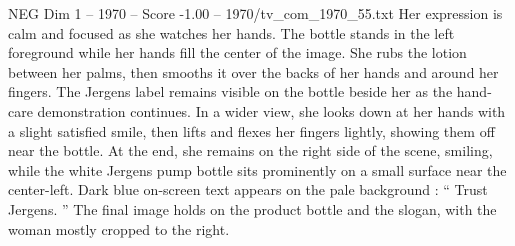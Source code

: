 \begin{textsample}{NEG Dim 1 – 1970 – Score -1.00 – 1970/tv\_com\_1970\_55.txt}
Her expression is calm and focused as she watches her hands.
The bottle stands in the left foreground while her hands fill the center of the image.
She rubs the lotion between her palms, then smooths it over the backs of her hands and around her fingers.
The Jergens label remains visible on the bottle beside her as the hand-care demonstration continues.
In a wider view, she looks down at her hands with a slight satisfied smile, then lifts and flexes her fingers lightly, showing them off near the bottle.
At the end, she remains on the right side of the scene, smiling, while the white Jergens pump bottle sits prominently on a small surface near the center-left.
Dark blue on-screen text appears on the pale background : “ Trust Jergens. ” The final image holds on the product bottle and the slogan, with the woman mostly cropped to the right.

\end{textsample}
